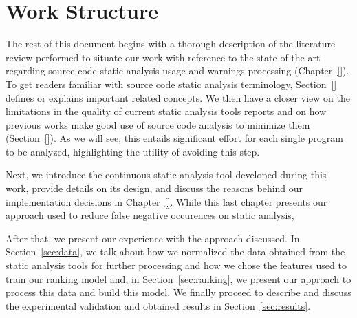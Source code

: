 \section{Work Structure}
\label{sec:structure}

The rest of this document begins with a thorough description of the literature
review performed to situate our work with reference to the
state of the art regarding source code static analysis usage and warnings
processing (Chapter~\ref{}). To get readers familiar with source code static analysis
terminology, Section~\ref{} defines or explains important related concepts. We
then have a closer view on the limitations in the quality of current static
analysis tools reports and on how previous works make good use of source code
analysis to minimize them (Section~\ref{}). As we will see, this entails
significant effort for each single program to be analyzed, highlighting the
utility of avoiding this step.

Next, we introduce the continuous static analysis tool developed during this
work, provide details on its design, and discuss the reasons behind our
implementation decisions in Chapter~\ref{}. While this last chapter presents
our approach used to reduce false negative occurences on static analysis, %

After that, we present our experience with the approach discussed. In
Section~\ref{sec:data}, we talk about how we normalized the data obtained from
the static analysis tools for further processing and how we chose the features
used to train our ranking model and, in Section~\ref{sec:ranking}, we present
our approach to process this data and build this model. We finally proceed to
describe and discuss the experimental validation and obtained results in
Section~\ref{sec:results}.
